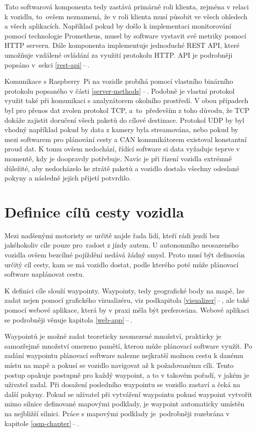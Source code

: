 \documentclass[czech, bachelor]{diploma}
\newcommand{\filipref}[1]{\ref{#1}\,--\,\nameref{#1}}
\begin{document}
Tato softwarová komponenta tedy zastává primárně roli klienta, zejména v relaci k vozidlu, to~ovšem neznamená, že v roli klienta
musí působit ve všech ohledech a všech aplikacích. Například pokud by došlo k implementaci monitorování pomocí technologie
Prometheus, musel by software vystavit své metriky pomocí HTTP serveru. Dále komponenta implementuje jednoduché REST API, které
umožňuje vzdálené ovládání za využití protokolu HTTP. API je podrobněji popsáno v~sekci \filipref{rest-api}.

Komunikace s Raspberry~Pi na vozidle probíhá pomocí vlastního binárního protokolu popsaného v části \filipref{server-methods}.
Podobně je vlastní protokol využit také při komunikaci s analyzátorem okolního prostředí. V obou případech byl pro přenos dat
zvolen protokol TCP, a~to~především z toho důvodu, že TCP dokáže zajistit doručení všech paketů do cílové destinace. Protokol UDP
by byl vhodný například pokud by data z kamery byla streamována, nebo pokud by mezi softwarem pro plánování cesty a CAN
komunikátorem existoval konstantní proud dat. K tomu ovšem nedochází, řídící software si data vyžaduje teprve v momentě, kdy je
doopravdy potřebuje. Navíc je při řízení vozidla extrémně důležité, aby nedocházelo ke ztrátě paketů a vozidlo dostalo všechny
odeslané pokyny a následně jejich přijetí potvrdilo.

\section{Definice cílů cesty vozidla} \label{target-definition}

Mezi nadšenými motoristy se určitě najde řada lidí, kteří rádi jezdí bez jakéhokoliv cíle pouze pro~radost z jízdy autem.
U autonomního neosazeného vozidla ovšem bezcílné pojíždění nedává žádný smysl. Proto musí být definován určitý cíl cesty, kam
se má vozidlo dostat, podle kterého poté může plánovací software naplánovat cestu.

K definici cíle slouží waypointy. Waypointy, tedy geografické body na mapě, lze zadat nejen pomocí grafického vizualizéru,
viz podkapitola \filipref{visualizer}, ale také pomocí webové aplikace, která by v praxi měla být preferována. Webové aplikaci
se podrobněji věnuje kapitola \filipref{web-app}.

Waypointů je možné zadat teoreticky neomezené množství, prakticky je samozřejmě množství omezeno pamětí, kterou může plánovací
software využít.  Po zadání waypointu plánovací software nalezne nejkratší možnou cestu k danému místu na mapě a pokusí se vozidlo
navigovat až k požadovanému cíli. Tento postup opakuje postupně pro každý waypoint, a to v takovém pořadí, v jakém je uživatel
zadal. Při dosažení posledního waypointu se vozidlo zastaví a čeká na další pokyny. Pokud se uživatel při vytváření waypointu
pokusí waypoint vytvořit mimo silnice definované mapovými podklady, je waypoint automaticky umístěn na nejbližší silnici.
Práce s mapovými podklady je~podrobněji rozebrána v kapitole \filipref{osm-chapter}.
\end{document}

